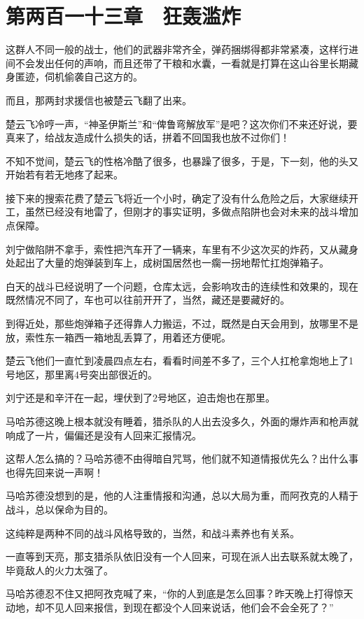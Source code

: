 \section{第两百一十三章　狂轰滥炸}

这群人不同一般的战士，他们的武器非常齐全，弹药捆绑得都非常紧凑，这样行进间不会发出任何的声响，而且还带了干粮和水囊，一看就是打算在这山谷里长期藏身匿迹，伺机偷袭自己这方的。

而且，那两封求援信也被楚云飞翻了出来。

楚云飞冷哼一声，“神圣伊斯兰”和“俾鲁弯解放军”是吧？这次你们不来还好说，要真来了，给战友造成什么损失的话，拼着不回国我也放不过你们！

不知不觉间，楚云飞的性格冷酷了很多，也暴躁了很多，于是，下一刻，他的头又开始若有若无地疼了起来。

接下来的搜索花费了楚云飞将近一个小时，确定了没有什么危险之后，大家继续开工，虽然已经没有地雷了，但刚才的事实证明，多做点陷阱也会对未来的战斗增加点保障。

刘宁做陷阱不拿手，索性把汽车开了一辆来，车里有不少这次买的炸药，又从藏身处起出了大量的炮弹装到车上，成树国居然也一瘸一拐地帮忙扛炮弹箱子。

白天的战斗已经说明了一个问题，仓库太远，会影响攻击的连续性和效果的，现在既然情况不同了，车也可以往前开开了，当然，藏还是要藏好的。

到得近处，那些炮弹箱子还得靠人力搬运，不过，既然是白天会用到，放哪里不是放，索性东一箱西一箱地乱丢算了，用着还方便呢。

楚云飞他们一直忙到凌晨四点左右，看看时间差不多了，三个人扛枪拿炮地上了1号地区，那里离4号突出部很近的。

刘宁还是和辛汗在一起，埋伏到了2号地区，迫击炮也在那里。

马哈苏德这晚上根本就没有睡着，猎杀队的人出去没多久，外面的爆炸声和枪声就响成了一片，偏偏还是没有人回来汇报情况。

这帮人怎么搞的？马哈苏德不由得暗自咒骂，他们就不知道情报优先么？出什么事也得先回来说一声啊！

马哈苏德没想到的是，他的人注重情报和沟通，总以大局为重，而阿孜克的人精于战斗，总以保命为目的。

这纯粹是两种不同的战斗风格导致的，当然，和战斗素养也有关系。

一直等到天亮，那支猎杀队依旧没有一个人回来，可现在派人出去联系就太晚了，毕竟敌人的火力太强了。

马哈苏德忍不住又把阿孜克喊了来，“你的人到底是怎么回事？昨天晚上打得惊天动地，却不见人回来报信，到现在都没个人回来说话，他们会不会全死了？”

